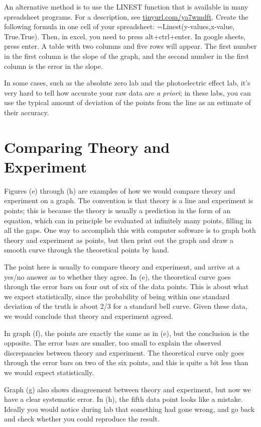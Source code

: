 An alternative method is to use the LINEST function that is available
in many spreadsheet programs. For a description, see \url{tinyurl.com/ya7wmdft}.
Create the following formula in
one cell of your spreadsheet: =Linest(y-values,x-value,
True.True). Then, in excel, you need to press alt+ctrl+enter. In
google sheets, press enter.  A table with two columns and five rows
will appear. The first number in the first column is the slope of the
graph, and the second number in the first column is the error in the
slope.

In some cases, such as the absolute zero
lab and the photoelectric effect lab, it's very hard to tell how accurate
your raw data are \emph{a priori}; in these labs, you can use the typical
amount of deviation of the points from the line as an estimate of their
accuracy.

\section{Comparing Theory and Experiment}

Figures (e) through (h) are examples of how we would compare theory and experiment
on a graph. The convention is that theory is a line and experiment is points; this
is because the theory is usually a prediction in the form of an equation, which can
in principle be evaluated at infinitely many points, filling in all the gaps. One way
to accomplish this with computer software is to graph both theory and experiment as
points, but then print out the graph and draw a smooth curve through the theoretical
points by hand.


The point here is usually to compare theory and experiment, and arrive at a yes/no answer
as to whether they agree. In (e), the theoretical curve goes through
the error bars on four out of six of the data points. This is about what we expect statistically,
since the probability of being within one standard deviation of the truth is about
2/3 for a standard bell curve. Given these data, we would conclude that theory and experiment
agreed.

In graph (f), the points are exactly the same as in (e), but the conclusion is the opposite.
The error bars are smaller, too small to explain the observed discrepancies between theory
and experiment. The theoretical curve only goes through the error bars on two of the six
points, and this is quite a bit less than we would expect statistically.

Graph (g) also shows disagreement between theory and experiment, but now we have a clear systematic
error. 
In (h), the fifth data point looks like a mistake. Ideally you would notice during lab that
something had gone wrong, and go back and check whether you could reproduce the result.
